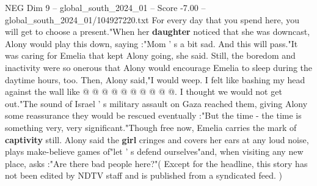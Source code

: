 \begin{textsample}{NEG Dim 9 – global\_south\_2024\_01 – Score -7.00 – global\_south\_2024\_01/104927220.txt}
For every day that you spend here, you will get to choose a present."When her \textbf{daughter} noticed that she was downcast, Alony would play this down, saying :"Mom ' s a bit sad.
And this will pass."It was caring for Emelia that kept Alony going, she said.
Still, the boredom and inactivity were so onerous that Alony would encourage Emelia to sleep during the daytime hours, too.
Then, Alony said,"I would weep.
I felt like bashing my head against the wall like @ @ @ @ @ @ @ @ @ @.
I thought we would not get out."The sound of Israel ' s military assault on Gaza reached them, giving Alony some reassurance they would be rescued eventually :"But the time - the time is something very, very significant."Though free now, Emelia carries the mark of \textbf{captivity} still.
Alony said the \textbf{girl} cringes and covers her ears at any loud noise, plays make-believe games of"let ' s defend ourselves"and, when visiting any new place, asks :"Are there bad people here?"( Except for the headline, this story has not been edited by NDTV staff and is published from a syndicated feed. )

\end{textsample}
